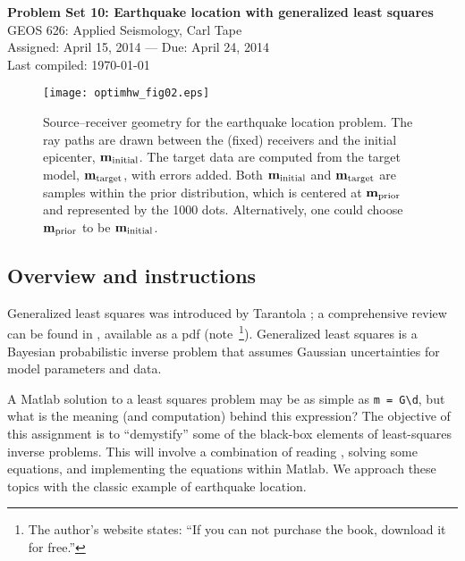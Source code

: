 \documentclass[11pt,titlepage,fleqn]{article}
\begin{document}

\begin{spacing}{1.2}
\begin{center}
{\large \bf Problem Set 10: Earthquake location with generalized least squares} \\
GEOS 626: Applied Seismology, Carl Tape \\
Assigned: April 15, 2014 --- Due: April 24, 2014 \\
Last compiled: \today
\end{center}
\end{spacing}


\vspace{1cm}
\begin{figure}[h]
\begin{center}
\texttt{[image: optimhw\_fig02.eps]}
\caption[Source-receiver geometry]
{{
Source--receiver geometry for the earthquake location problem. The ray paths are drawn between the (fixed) receivers and the initial epicenter, $\mbox{${\bf m}$}_{\rm initial}$. The target data are computed from the target model, $\mbox{${\bf m}$}_{\rm target}$, with errors added. Both $\mbox{${\bf m}$}_{\rm initial}$ and $\mbox{${\bf m}$}_{\rm target}$ are samples within the prior distribution, which is centered at $\mbox{${\bf m}$}_{\rm prior}$ and represented by the 1000 dots. Alternatively, one could choose $\mbox{${\bf m}$}_{\rm prior}$ to be $\mbox{${\bf m}$}_{\rm initial}$.
\label{fig:srcrec}
}}
\end{center}
\end{figure}


\vspace{-1cm}
\subsection*{Overview and instructions}

Generalized least squares was introduced by Tarantola \citep{TarantolaValette1982quest,TarantolaValette1982nonlinear}; a comprehensive review can be found in \citet{Tarantola2005}, available as a pdf (note~\footnote{The author's website states: ``If you can not purchase the book, download it for free.''}). Generalized least squares is a Bayesian probabilistic inverse problem that assumes Gaussian uncertainties for model parameters and data.

A Matlab solution to a least squares problem may be as simple as \verb+m = G\d+, but what is the meaning (and computation) behind this expression? The objective of this assignment is to ``demystify'' some of the black-box elements of least-squares inverse problems. This will involve a combination of reading \citet{Tarantola2005}, solving some equations, and implementing the equations within Matlab. We approach these topics with the classic example of earthquake location.
\end{document}
